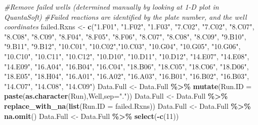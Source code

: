 \documentclass[
]{article}
\newenvironment{Shaded}{\begin{snugshade}}{\end{snugshade}}
\newcommand{\AttributeTok}[1]{\textcolor[rgb]{0.13,0.29,0.53}{#1}}
\newcommand{\CommentTok}[1]{\textcolor[rgb]{0.56,0.35,0.01}{\textit{#1}}}
\newcommand{\DecValTok}[1]{\textcolor[rgb]{0.00,0.00,0.81}{#1}}
\newcommand{\FunctionTok}[1]{\textcolor[rgb]{0.13,0.29,0.53}{\textbf{#1}}}
\newcommand{\NormalTok}[1]{#1}
\newcommand{\OtherTok}[1]{\textcolor[rgb]{0.56,0.35,0.01}{#1}}
\newcommand{\SpecialCharTok}[1]{\textcolor[rgb]{0.81,0.36,0.00}{\textbf{#1}}}
\newcommand{\StringTok}[1]{\textcolor[rgb]{0.31,0.60,0.02}{#1}}
\begin{document}
\begin{Shaded}
\begin{Highlighting}[]
\CommentTok{\#Remove failed wells (determined manually by looking at 1{-}D plot in QuantaSoft)}
\CommentTok{\#Failed reactions are identified by the plate number, and the well coordinates}
\NormalTok{failed.Rxns }\OtherTok{\textless{}{-}} \FunctionTok{c}\NormalTok{(}\StringTok{"1.F01"}\NormalTok{, }\StringTok{"1.F02"}\NormalTok{, }\StringTok{"1.F03"}\NormalTok{, }\StringTok{"7.C02"}\NormalTok{, }\StringTok{"7.C02"}\NormalTok{, }\StringTok{"8.C07"}\NormalTok{, }\StringTok{"8.C08"}\NormalTok{,}
                 \StringTok{"8.C09"}\NormalTok{, }\StringTok{"8.F04"}\NormalTok{, }\StringTok{"8.F05"}\NormalTok{, }\StringTok{"8.F06"}\NormalTok{, }\StringTok{"8.C07"}\NormalTok{, }\StringTok{"8.C08"}\NormalTok{, }\StringTok{"8.C09"}\NormalTok{,}
                 \StringTok{"9.B10"}\NormalTok{, }\StringTok{"9.B11"}\NormalTok{, }\StringTok{"9.B12"}\NormalTok{, }\StringTok{"10.C01"}\NormalTok{, }\StringTok{"10.C02"}\NormalTok{,}\StringTok{"10.C03"}\NormalTok{, }\StringTok{"10.G04"}\NormalTok{,}
                 \StringTok{"10.G05"}\NormalTok{, }\StringTok{"10.G06"}\NormalTok{, }\StringTok{"10.C10"}\NormalTok{, }\StringTok{"10.C11"}\NormalTok{, }\StringTok{"10.C12"}\NormalTok{, }\StringTok{"10.D10"}\NormalTok{,}
                 \StringTok{"10.D11"}\NormalTok{, }\StringTok{"10.D12"}\NormalTok{, }\StringTok{"14.E07"}\NormalTok{, }\StringTok{"14.E08"}\NormalTok{, }\StringTok{"14.E09"}\NormalTok{, }\StringTok{"16.A04"}\NormalTok{,}
                 \StringTok{"16.B04"}\NormalTok{, }\StringTok{"16.C04"}\NormalTok{, }\StringTok{"18.B06"}\NormalTok{, }\StringTok{"18.C05"}\NormalTok{, }\StringTok{"18.C06"}\NormalTok{, }\StringTok{"18.D06"}\NormalTok{,}
                 \StringTok{"18.E05"}\NormalTok{, }\StringTok{"18.H04"}\NormalTok{, }\StringTok{"16.A01"}\NormalTok{, }\StringTok{"16.A02"}\NormalTok{, }\StringTok{"16.A03"}\NormalTok{, }\StringTok{"16.B01"}\NormalTok{,}
                 \StringTok{"16.B02"}\NormalTok{, }\StringTok{"16.B03"}\NormalTok{, }\StringTok{"14.C07"}\NormalTok{, }\StringTok{"14.C08"}\NormalTok{, }\StringTok{"14.C09"}\NormalTok{)  }
\NormalTok{Data.Full }\OtherTok{\textless{}{-}}\NormalTok{ Data.Full }\SpecialCharTok{\%\textgreater{}\%} \FunctionTok{mutate}\NormalTok{(}\AttributeTok{Run.ID =} \FunctionTok{paste}\NormalTok{(}\FunctionTok{as.character}\NormalTok{(Run),Well,}\AttributeTok{sep=}\StringTok{"."}\NormalTok{))}
\NormalTok{Data.Full }\OtherTok{\textless{}{-}}\NormalTok{ Data.Full }\SpecialCharTok{\%\textgreater{}\%} \FunctionTok{replace\_with\_na}\NormalTok{(}\FunctionTok{list}\NormalTok{(}\AttributeTok{Run.ID =}\NormalTok{ failed.Rxns))}
\NormalTok{Data.Full }\OtherTok{\textless{}{-}}\NormalTok{ Data.Full }\SpecialCharTok{\%\textgreater{}\%} \FunctionTok{na.omit}\NormalTok{()}
\NormalTok{Data.Full }\OtherTok{\textless{}{-}}\NormalTok{ Data.Full }\SpecialCharTok{\%\textgreater{}\%} \FunctionTok{select}\NormalTok{(}\SpecialCharTok{{-}}\FunctionTok{c}\NormalTok{(}\DecValTok{11}\NormalTok{))}



\end{Highlighting}
\end{Shaded}
\end{document}
